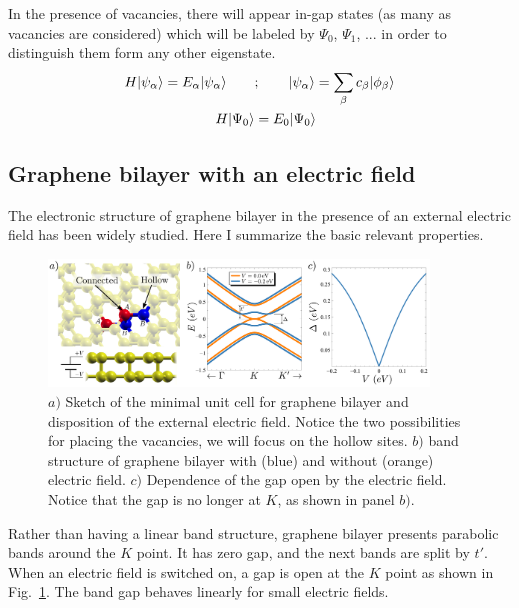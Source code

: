 In the presence of vacancies, there will appear in-gap states (as many as vacancies are considered) which will be labeled by $\Psi_0$, $\Psi_1$, ... in order to distinguish them form any other eigenstate.
\begin{equation}
\begin{split}
  H|\psi_\alpha\rangle = E_\alpha|\psi_\alpha\rangle \qquad&;\qquad
|\psi_\alpha\rangle = \sum_\beta c_\beta|\phi_\beta\rangle\\
  H|\Psi_0\rangle &= E_0|\Psi_0\rangle
\end{split}
\end{equation}

\subsection{Graphene bilayer with an electric field}
The electronic structure of graphene bilayer in the presence of an external electric field has been widely studied. Here I summarize the basic relevant properties.\\
\begin{figure}[!ht!]
\centering
\includegraphics[width=0.9\textwidth]{artlat/fig/bands_bilayer.pdf}
\vspace{-5pt}
\caption{$a)$ Sketch of the minimal unit cell for graphene bilayer and disposition of the external electric field. Notice the two possibilities for placing the vacancies, we will focus on the hollow sites. $b)$ band structure of graphene bilayer with (blue) and without (orange) electric field. $c)$ Dependence of the gap open by the electric field. Notice that the gap is no longer at $K$, as shown in panel $b)$.}
\label{bilayer2d}
\end{figure}
Rather than having a linear band structure, graphene bilayer presents parabolic bands around the $K$ point. It has zero gap, and the next bands are split by $t'$. When an electric field is switched on, a gap is open at the $K$ point as shown in Fig.~\ref{bilayer2d}. The band gap behaves linearly for small electric fields.

